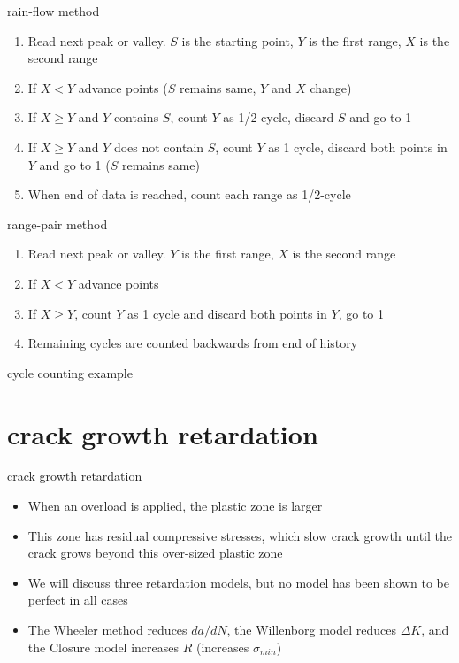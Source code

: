 \documentclass[10pt]{beamer}
\begin{document}
\begin{frame}{rain-flow method}
	\begin{enumerate}[<+->]
		\item Read next peak or valley. $S$ is the starting point, $Y$ is the first range, $X$ is the second range
		\item If $X < Y$ advance points ($S$ remains same, $Y$ and $X$ change)
		\item If $X \ge Y$ and $Y$ contains $S$, count $Y$ as 1/2-cycle, discard $S$ and go to 1
		\item If $X \ge Y$ and $Y$ does not contain $S$, count $Y$ as 1 cycle, discard both points in $Y$ and go to 1 ($S$ remains same)
		\item When end of data is reached, count each range as 1/2-cycle
	\end{enumerate}
\end{frame}

\begin{frame}{range-pair method}
	\begin{enumerate}[<+->]
		\item Read next peak or valley. $Y$ is the first range, $X$ is the second range
		\item If $X < Y$ advance points
		\item If $X \ge Y$, count $Y$ as 1 cycle and discard both points in $Y$, go to 1
		\item Remaining cycles are counted backwards from end of history
	\end{enumerate}
\end{frame}

\begin{frame}{cycle counting example}
	
\end{frame}

\section{crack growth retardation}

\begin{frame}{crack growth retardation}
	\begin{itemize}[<+->]
		\item When an overload is applied, the plastic zone is larger
		\item This zone has residual compressive stresses, which slow crack growth until the crack grows beyond this over-sized plastic zone
		\item We will discuss three retardation models, but no model has been shown to be perfect in all cases
		\item The Wheeler method reduces $da/dN$, the Willenborg model reduces $\Delta K$, and the Closure model increases $R$ (increases $\sigma_{min}$)
	\end{itemize}
\end{frame}
\end{document}
